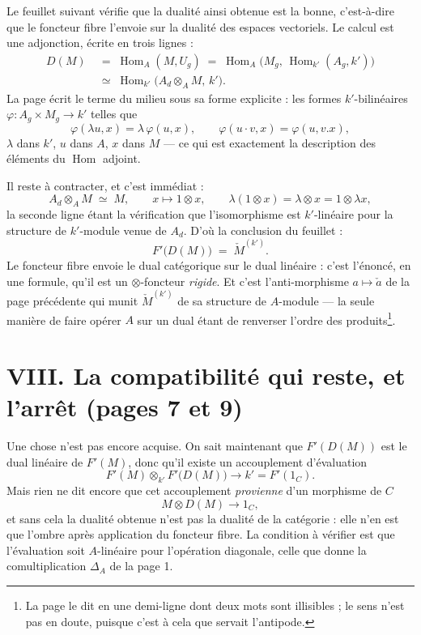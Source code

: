 \documentclass[11pt,a4paper]{article}
\begin{document}
Le feuillet suivant vérifie que la dualité ainsi obtenue est la bonne,
c'est-à-dire que le foncteur fibre l'envoie sur la dualité des espaces
vectoriels. Le calcul est une adjonction, écrite en trois lignes :
\begin{align*}
D(M) &\;=\; \operatorname{Hom}_{A}(M, U_{g})
\;=\; \operatorname{Hom}_{A}\bigl(M_{g},\,
\operatorname{Hom}_{k'}(A_{g}, k')\bigr) \\
&\;\simeq\; \operatorname{Hom}_{k'}\bigl(A_{d} \otimes_{A} M,\, k'\bigr).
\end{align*}
La page écrit le terme du milieu sous sa forme explicite : les formes
$k'$-bilinéaires $\varphi : A_{g} \times M_{g} \to k'$ telles que
\[
\varphi(\lambda u, x) = \lambda\,\varphi(u,x),
\qquad
\varphi(u\cdot v, x) = \varphi(u, v.x),
\]
$\lambda$ dans $k'$, $u$ dans $A$, $x$ dans $M$ — ce qui est exactement la
description des éléments du $\operatorname{Hom}$ adjoint.

Il reste à contracter, et c'est immédiat :
\[
A_{d} \otimes_{A} M \;\simeq\; M,
\qquad
x \longmapsto 1 \otimes x,
\qquad
\lambda(1 \otimes x) = \lambda \otimes x = 1 \otimes \lambda x,
\]
la seconde ligne étant la vérification que l'isomorphisme est $k'$-linéaire
pour la structure de $k'$-module venue de $A_{d}$. D'où la conclusion du
feuillet :
\[
F'\bigl(D(M)\bigr) \;=\; \check{M}^{(k')}.
\]
Le foncteur fibre envoie le dual catégorique sur le dual linéaire : c'est
l'énoncé, en une formule, qu'il est un $\otimes$-foncteur \emph{rigide}. Et
c'est l'anti-morphisme $a \mapsto \check{a}$ de la page précédente qui munit
$\check{M}^{(k')}$ de sa structure de $A$-module — la seule manière de faire
opérer $A$ sur un dual étant de renverser l'ordre des produits\footnote{La page
le dit en une demi-ligne dont deux mots sont illisibles ; le sens n'est pas en
doute, puisque c'est à cela que servait l'antipode.}.

\section*{VIII. La compatibilité qui reste, et l'arrêt (pages 7 et 9)}

Une chose n'est pas encore acquise. On sait maintenant que $F'(D(M))$ est le
dual linéaire de $F'(M)$, donc qu'il existe un accouplement d'évaluation
\[
F'(M) \otimes_{k'} F'\bigl(D(M)\bigr) \longrightarrow k' = F'(1_{C}).
\]
Mais rien ne dit encore que cet accouplement \emph{provienne} d'un morphisme de
$C$
\[
M \otimes D(M) \longrightarrow 1_{C},
\]
et sans cela la dualité obtenue n'est pas la dualité de la catégorie : elle
n'en est que l'ombre après application du foncteur fibre. La condition à
vérifier est que l'évaluation soit $A$-linéaire pour l'opération diagonale,
celle que donne la comultiplication $\Delta_{A}$ de la page 1.
\end{document}
